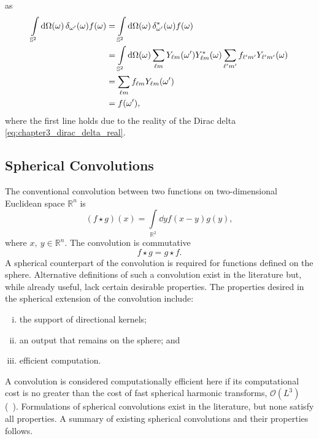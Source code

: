 %
as
%
\begin{align}
    \integrateSphere{\omega} \pixel{\delta_{\omega'}} \pixel{f}
     & = \integrateSphere{\omega} \pixel{\conj{\delta_{\omega'}}} \pixel{f} \nonumber{}                                                                                \\
     & = \integrateSphere{\omega} \harmonicSum \pixel[']{\harmonic{Y}} \pixel{\conj{\harmonic{Y}}} \harmonicSum['] \harmonic[']{f} \pixel{\harmonic[']{Y}} \nonumber{} \\
     & = \harmonicSum \harmonic{f} \pixel[']{\harmonic{Y}} \nonumber{}                                                                                                 \\
     & = \pixel[']{f},
\end{align}
%
where the first line holds due to the reality of the Dirac delta \cref{eq:chapter3_dirac_delta_real}.

\subsection{Spherical Convolutions}\label{sec:chapter3_spherical_convolutions}

The conventional convolution between two functions on two-dimensional Euclidean space \(\mathbb{R}^{n}\) is
%
\begin{equation}
    (f \star g)(x)
    = \int\limits_{\mathbb{R}^{2}} \dd{y} f(x-y) g(y),
\end{equation}
%
where \(x,\ y \in \mathbb{R}^{n}\).
The convolution is commutative
%
\begin{equation}
    f \star g
    = g \star f.
\end{equation}
%
A spherical counterpart of the convolution is required for functions defined on the sphere.
Alternative definitions of such a convolution exist in the literature but, while already useful, lack certain desirable properties.
The properties desired in the spherical extension of the convolution include:
%
\begin{enumerate}[(i),nosep,left=\parindent]
    \item the support of directional kernels;
    \item an output that remains on the sphere; and
    \item efficient computation.
\end{enumerate}
%
A convolution is considered computationally efficient here if its computational cost is no greater than the cost of fast spherical harmonic transforms, \ie{} \(\mathcal{O}(L^{3})\) (\eg{}~\cite{Driscoll1994,McEwen2011}).
Formulations of spherical convolutions exist in the literature, but none satisfy all properties.
A summary of existing spherical convolutions and their properties follows.

